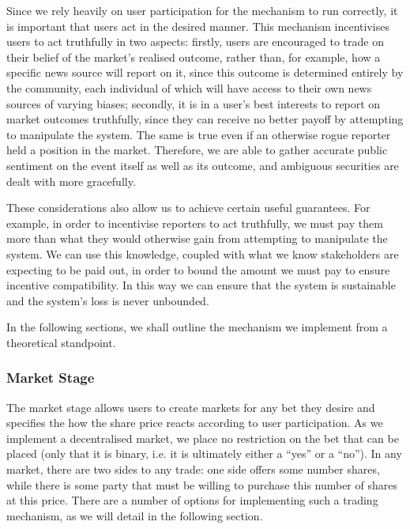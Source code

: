 Since we rely heavily on user participation for the mechanism to run correctly,
it is important that users act in the desired manner. This mechanism
incentivises users to act truthfully in two aspects: firstly, users are
encouraged to trade on their belief of the market's realised outcome, rather
than, for example, how a specific news source will report on it, since this
outcome is determined entirely by the community, each individual of which will
have access to their own news sources of varying biases; secondly, it is in a
user's best interests to report on market outcomes truthfully, since they can
receive no better payoff by attempting to manipulate the system. The same is
true even if an otherwise rogue reporter held a position in the market.
Therefore, we are able to gather accurate public sentiment on the event itself
as well as its outcome, and ambiguous securities are dealt with more gracefully.

These considerations also allow us to achieve certain useful guarantees. For
example, in order to incentivise reporters to act truthfully, we must pay them
more than what they would otherwise gain from attempting to manipulate the
system. We can use this knowledge, coupled with what we know stakeholders are
expecting to be paid out, in order to bound the amount we must pay to
ensure incentive compatibility. In this way we can ensure that the system is
sustainable and the system's loss is never unbounded.

In the following sections, we shall outline the mechanism we implement from a
theoretical standpoint.

\subsubsection{Market Stage}

The market stage allows users to create markets for any bet they desire and
specifies the how the share price reacts according to user participation. As we
implement a decentralised market, we place no restriction on the bet that can
be placed (only that it is binary, i.e. it is ultimately either a ``yes'' or a
``no''). In any market, there are two sides to any trade: one side offers some
number shares, while there is some party that must be willing to purchase this
number of shares at this price. There are a number of options for implementing
such a trading mechanism, as we will detail in the following section.

